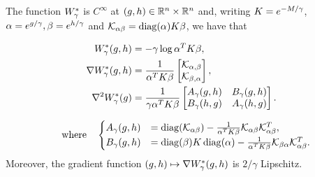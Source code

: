 \begin{proposition}\label{eq-obj-bothvar}
	The function $W^*_\gamma$ is $C^\infty$ at $(g,h) \in \mathbb{R}^n \times \mathbb{R}^n$ and, writing $K=e^{-M/\gamma}$, $\alpha=e^{g/\gamma}, \beta=e^{h/\gamma}$ and $\Kcal_{\alpha\beta} = \diag(\alpha)K \beta$, we have that
			
	\begin{align*}%
  		W^*_\ga(g,h) &= -\gamma \log \alpha^TK\beta,\\%
		\nabla W^*_\ga(g,h) &= \frac{1}{\alpha^T K \beta}\begin{bmatrix}\Kcal_{\alpha,\beta} \\ \Kcal_{\beta,\alpha}\end{bmatrix},\\%
\nabla^2 W_\ga^*(g) &= \frac{1}{\ga\alpha^T K \beta} \begin{bmatrix} A_\gamma(g,h) & B_\gamma(g,h) \\ B_\gamma(h,g ) & A_\gamma(h,g )\end{bmatrix}.				
		\end{align*}
		
	$$	
	\qwhereq					
	\begin{cases}
		A_\gamma(g,h) &=  \diag(\Kcal_{\alpha\beta})- \frac{1}{\alpha^T K \beta}\Kcal_{\alpha\beta}\Kcal_{\alpha\beta}^T,\\
		B_\gamma(g,h) &= \diag(\beta)\K \diag(\alpha)-\frac{1}{\alpha^T K \beta}\Kcal_{\beta\alpha}\Kcal^T_{\alpha\beta}.
	\end{cases}
	$$
	Moreover, the gradient function $(g,h)\mapsto\nabla W^*_\gamma(g,h)$ is $2/\gamma$ Lipschitz.	
\end{proposition}	
